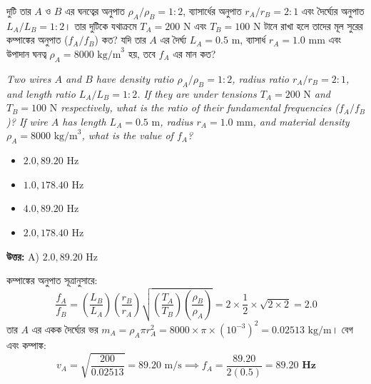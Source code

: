 \documentclass[12pt, a4paper]{article}
\begin{document}
\vspace{2em}

\begin{tcolorbox}[questionbox={প্রশ্ন (Question) 21}]
    \noindent
    দুটি তার $A$ ও $B$ এর ঘনত্বের অনুপাত $\rho_A / \rho_B = 1 : 2$, ব্যাসার্ধের অনুপাত $r_A / r_B = 2 : 1$ এবং দৈর্ঘ্যের অনুপাত $L_A / L_B = 1 : 2$। তার দুটিকে যথাক্রমে $T_A = 200\text{ N}$ এবং $T_B = 100\text{ N}$ টানে রাখা হলে তাদের মূল সুরের কম্পাঙ্কের অনুপাত ($f_A / f_B$) কত? যদি তার $A$ এর দৈর্ঘ্য $L_A = 0.5\text{ m}$, ব্যাসার্ধ $r_A = 1.0\text{ mm}$ এবং উপাদান ঘনত্ব $\rho_A = 8000\text{ kg/m}^3$ হয়, তবে $f_A$ এর মান কত?
    
    \vspace{0.8em}
    \begin{english}
    \noindent\textit{\color{darkgray}
    Two wires $A$ and $B$ have density ratio $\rho_A / \rho_B = 1 : 2$, radius ratio $r_A / r_B = 2 : 1$, and length ratio $L_A / L_B = 1 : 2$. If they are under tensions $T_A = 200\text{ N}$ and $T_B = 100\text{ N}$ respectively, what is the ratio of their fundamental frequencies ($f_A / f_B$)? If wire $A$ has length $L_A = 0.5\text{ m}$, radius $r_A = 1.0\text{ mm}$, and material density $\rho_A = 8000\text{ kg/m}^3$, what is the value of $f_A$?
    }
    \end{english}
\end{tcolorbox}

\begin{itemize}[label={}, leftmargin=1cm, itemsep=0.5em]
    \item[\textbf{A)}] $2.0, 89.20\text{ Hz}$
    \item[\textbf{B)}] $1.0, 178.40\text{ Hz}$
    \item[\textbf{C)}] $4.0, 89.20\text{ Hz}$
    \item[\textbf{D)}] $2.0, 178.40\text{ Hz}$
\end{itemize}

\vspace{0.5em}
\begin{tcolorbox}[answerbox]
    \textbf{\color{success} উত্তর:} A) $2.0, 89.20\text{ Hz}$
\end{tcolorbox}
\vspace{1em}

\begin{tcolorbox}[solutionbox={সমাধান (Solution)}]
    \noindent
    কম্পাঙ্কের অনুপাত সূত্রানুসারে:
    \[ \frac{f_A}{f_B} = \left(\frac{L_B}{L_A}\right) \left(\frac{r_B}{r_A}\right) \sqrt{\left(\frac{T_A}{T_B}\right) \left(\frac{\rho_B}{\rho_A}\right)} = 2 \times \frac{1}{2} \times \sqrt{2 \times 2} = \mathbf{2.0} \]
    তার $A$ এর একক দৈর্ঘ্যের ভর $m_A = \rho_A \pi r_A^2 = 8000 \times \pi \times (10^{-3})^2 = 0.02513\text{ kg/m}$। বেগ এবং কম্পাঙ্ক:
    \[ v_A = \sqrt{\frac{200}{0.02513}} = 89.20\text{ m/s} \implies f_A = \frac{89.20}{2(0.5)} = \mathbf{89.20\text{ Hz}} \]
\end{tcolorbox}
\end{document}
